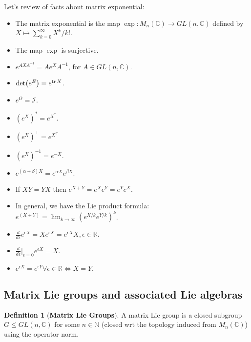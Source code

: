 \documentclass{book}
\theoremstyle{definition}
\newtheorem{defn}{Definition}[section]
\newcommand{\R}{\mathbb{R}}
\newcommand{\C}{\mathbb{C}}
\newcommand{\al}{\alpha}
\newcommand{\be}{\beta}
\newcommand{\ep}{\epsilon}
\newcommand{\f}[2]{\frac{#1}{#2}}
\newcommand{\lp}{\left(}
\newcommand{\rp}{\right)}
\newcommand{\Id}{\mathcal{I}}
\begin{document}
Let's review of facts about matrix exponential:
\begin{itemize}
	\item The matrix exponential is the map $\exp: M_n(\C) \to GL(n,\C)$ defined by $X \mapsto \sum^\infty_{k=0} X^k/k!$. 
	
	\item The map $\exp$ is surjective.
	
	\item $e^{AXA^{-1}} = A e^X A^{-1}$, for $A\in GL(n,\C)$.
	
	\item $\det(e^E) = e^{\tr X}$.
	
	\item $e^O = \Id$.
	
	\item $(e^X)^* = e^{X^*}$.
	
	\item $(e^X)^\top = e^{X^\top}$
	
	
	\item $(e^X)^{-1} = e^{-X}$. 
	
	\item $e^{(\al+\be )X} = e^{\al X} e^{\be X}$.
	
	\item If $XY=YX$ then $e^{X+Y} = e^X e^Y = e^Y e^X$.
	
	\item In general, we have the Lie product formula:  $e^{(X+Y)} = \lim_{k\to \infty}\lp e^{ X/k}e^{ Y/k} \rp^{k}$.
	
	
	\item $\f{d}{d\ep}e^{\ep X} = X e^{\ep X} = e^{\ep X} X, \ep \in \R$.
	
	\item $\f{d}{d\ep}\bigg\vert_{\ep =0}e^{\ep X} = X$.
	
	\item $e^{\ep X} = e^{\ep Y} \forall \ep \in \R \iff X=Y$.
\end{itemize}













\subsection{Matrix Lie groups and associated Lie algebras}

\begin{defn}[\textbf{Matrix Lie Groups}]
	A matrix Lie group is a closed subgroup  $G \leq GL(n,\mathbb{C})$ for some $n\in \mathbb{N}$ (closed wrt the topology induced from $M_n(\mathbb{C})$) using the  operator norm. 
\end{defn}
\end{document}
